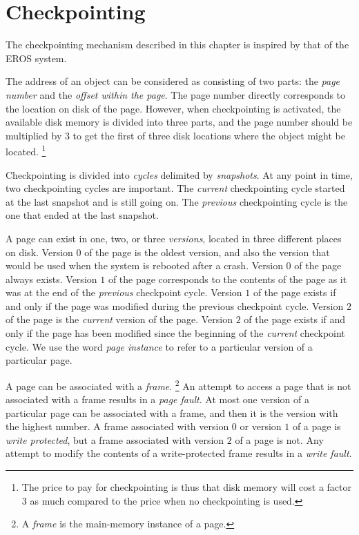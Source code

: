 \chapter{Checkpointing}
\label{chap-checkpointing}

The checkpointing mechanism described in this chapter is inspired by
that of the EROS system.

The address of an object can be considered as consisting of two parts:
the \emph{page number} and the \emph{offset within the page}.  The
page number directly corresponds to the location on disk of the page.
However, when checkpointing is activated, the available disk memory is
divided into three parts, and the page number should be multiplied by
3 to get the first of three disk locations where the object might be
located.%
\footnote{The price to pay for checkpointing is thus that disk memory
  will cost a factor 3 as much compared to the price when no
  checkpointing is used.}

Checkpointing is divided into \emph{cycles} delimited by
\emph{snapshots}.  At any point in time, two checkpointing cycles are
important.  The \emph{current} checkpointing cycle started at the
last snapshot and is still going on.  The \emph{previous}
checkpointing cycle is the one that ended at the last snapshot. 

A page can exist in one, two, or three \emph{versions}, located in
three different places on disk.  Version $0$ of the page is the oldest
version, and also the version that would be used when the system is
rebooted after a crash.  Version $0$ of the page always exists.
Version $1$ of the page corresponds to the contents of the page as it
was at the end of the \emph{previous} checkpoint cycle.  Version $1$
of the page exists if and only if the page was modified during the
previous checkpoint cycle.  Version $2$ of the page is the
\emph{current} version of the page.  Version $2$ of the page exists if
and only if the page has been modified since the beginning of the
\emph{current} checkpoint cycle.  We use the word \emph{page instance}
to refer to a particular version of a particular page. 

A page can be associated with a \emph{frame}.%
\footnote{A \emph{frame} is the main-memory instance of a page.}  An
attempt to access a page that is not associated with a frame results
in a \emph{page fault}.  At most one version of a particular page can
be associated with a frame, and then it is the version with the
highest number.  A frame associated with version $0$ or version $1$ of
a page is \emph{write protected}, but a frame associated with version
$2$ of a page is not.  Any attempt to modify the contents of a
write-protected frame results in a \emph{write fault}.

